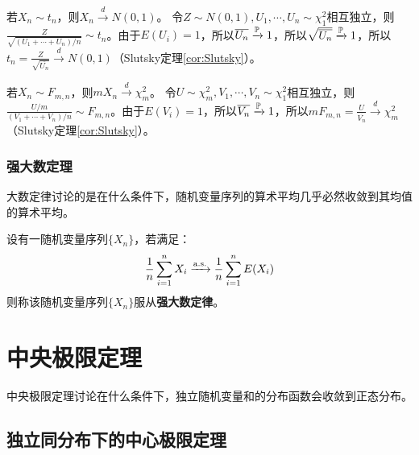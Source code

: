 \begin{example}\label{ex:t_disc_to_normal}
    若$X_n \sim t_n$，则$X_n \xrightarrow{d} N(0,1)$。
    令$Z \sim N(0,1),U_1,\cdots ,U_n \sim \chi^2_1$相互独立，则$\frac{Z}{\sqrt{(U_1+\cdots+U_n)/n}} \sim t_n$。由于$E(U_i)=1$，所以$\overline{U_n} \xrightarrow{\P} 1$，所以$\sqrt{\overline{U_n}} \xrightarrow{\P} 1$，所以$t_n=\frac{Z}{\sqrt{\overline{U_n}}} \xrightarrow{d} N(0,1)$（Slutsky定理\ref{cor:Slutsky}）。
\end{example}

\begin{example}
    若$X_n \sim F_{m,n}$，则$mX_n \xrightarrow{d} \chi^2_m$。
    令$U \sim \chi^2_m,V_1,\cdots ,V_n \sim \chi^2_1$相互独立，则$\frac{U/m}{(V_1+\cdots+V_n)/n} \sim F_{m,n}$。由于$E(V_i)=1$，所以$\overline{V_n} \xrightarrow{\P} 1$，所以$mF_{m,n}=\frac{U}{\overline{V_n}} \xrightarrow{d} \chi^2_m$（Slutsky定理\ref{cor:Slutsky}）。
\end{example}

\subsubsection{强大数定理}

大数定律讨论的是在什么条件下，随机变量序列的算术平均几乎必然收敛到其均值的算术平均。

\begin{definition}[强大数定律的一般形式]\label{def:strong_large_number_law}
    设有一随机变量序列$\{ X_n \}$，若满足：
    \[ \frac1n \sum_{i=1}^n X_i \xrightarrow{\as} \frac1n \sum_{i=1}^n E(X_i) \]
    则称该随机变量序列$\{ X_n \}$服从\textbf{强大数定律}。
\end{definition}




\section{中央极限定理}

中央极限定理讨论在什么条件下，独立随机变量和的分布函数会收敛到正态分布。

\subsection{独立同分布下的中心极限定理}

